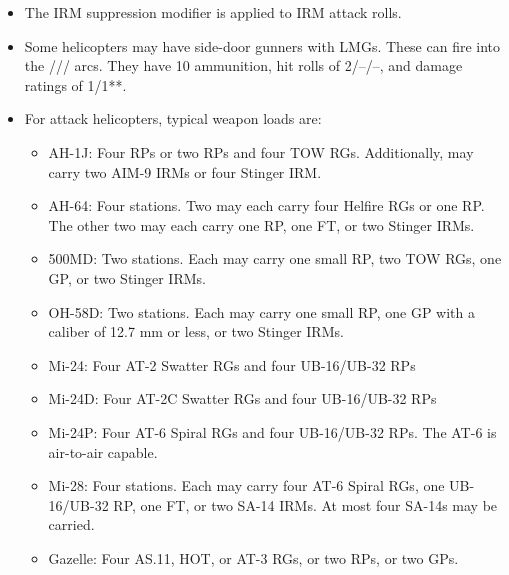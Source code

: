 \begin{landscape}
\begin{fullwidthtable}
\begin{tablenote}{\linewidth}
\begin{itemize}
    \item The IRM suppression modifier is applied to IRM attack rolls.

    \item Some helicopters may have side-door gunners with LMGs. These can fire into the /// arcs. They have 10 ammunition, hit rolls of 2/--/--, and damage ratings of 1/1**.

    \item For attack helicopters, typical weapon loads are:
    \begin{itemize}
        \item AH-1J: Four RPs or two RPs and four TOW RGs. Additionally, may carry two AIM-9 IRMs or four Stinger IRM.
        \item AH-64: Four stations. Two may each carry four Helfire RGs or one RP. The other two may each carry one RP, one FT, or two Stinger IRMs.
        \item 500MD: Two stations. Each may carry one small RP, two TOW RGs, one GP, or two Stinger IRMs.
        \item OH-58D: Two stations. Each may carry one small RP, one GP with a caliber of 12.7 mm or less, or two Stinger IRMs.
        \item Mi-24: Four AT-2 Swatter RGs and four UB-16/UB-32 RPs
        \item Mi-24D: Four AT-2C Swatter RGs and four UB-16/UB-32 RPs
        \item Mi-24P: Four AT-6 Spiral RGs and four UB-16/UB-32 RPs. The AT-6 is air-to-air capable.
        \item Mi-28: Four stations. Each may carry four AT-6 Spiral RGs, one UB-16/UB-32 RP, one FT, or two SA-14 IRMs. At most four SA-14s may be carried.
        \item Gazelle: Four AS.11, HOT, or AT-3 RGs, or two RPs, or two GPs.
    \end{itemize}
\end{itemize}
\end{tablenote}

\end{fullwidthtable}

\end{landscape}

